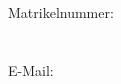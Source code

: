 \begin{titlepage}
\vspace*{\fill}%
\begin{figure}
	\myName \\
	Matrikelnummer:  \myMatNr \\
	\myStreetAddress \vspace{0.1cm} \\ 
	\myCityAddress \vspace{0.1cm}  \\
	E-Mail: \myEmail \\ 
\end{figure}

\end{titlepage}

